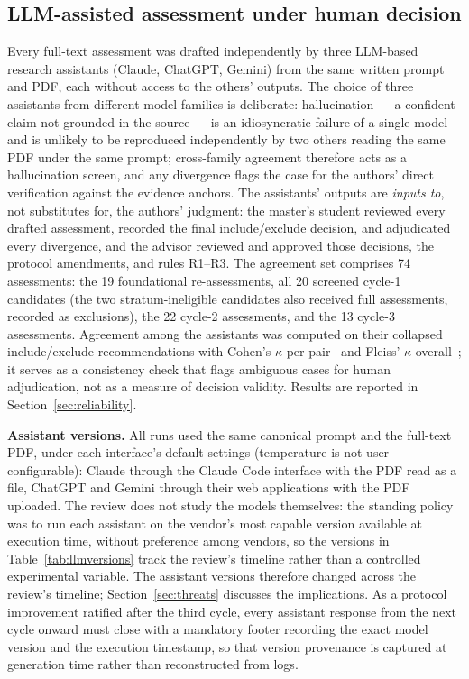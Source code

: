 \documentclass{ieeeaccess}
\begin{document}
\subsection{LLM-assisted assessment under human decision}
Every full-text assessment was drafted independently by three LLM-based
research assistants (Claude, ChatGPT, Gemini) from the same written
prompt and PDF, each without access to the others' outputs. The choice
of three assistants from different model families is deliberate:
hallucination --- a confident claim not grounded in the source --- is an
idiosyncratic failure of a single model and is unlikely to be reproduced
independently by two others reading the same PDF under the same prompt;
cross-family agreement therefore acts as a hallucination screen, and any
divergence flags the case for the authors' direct verification against
the evidence anchors. The
assistants' outputs are \emph{inputs to}, not substitutes for, the
authors' judgment: the master's student reviewed every drafted
assessment, recorded the final include/exclude decision, and
adjudicated every divergence, and the advisor reviewed and approved
those decisions, the protocol amendments, and rules R1--R3. The
agreement set comprises 74 assessments: the 19 foundational
re-assessments, all 20 screened cycle-1 candidates (the two
stratum-ineligible candidates also received full assessments, recorded
as exclusions), the 22 cycle-2 assessments, and the 13 cycle-3
assessments. Agreement among the assistants was computed on their
collapsed include/exclude recommendations with Cohen's $\kappa$ per
pair~\cite{cohen1960} and Fleiss' $\kappa$ overall~\cite{fleiss1971};
it serves as a consistency check that flags ambiguous cases for human
adjudication, not as a measure of decision validity. Results are
reported in
Section~\ref{sec:reliability}.

\textbf{Assistant versions.} All runs used the same canonical prompt and
the full-text PDF, under each interface's default settings (temperature
is not user-configurable): Claude through the Claude Code interface with
the PDF read as a file, ChatGPT and Gemini through their web applications
with the PDF uploaded. The review does not study the models themselves: the
standing policy was to run each assistant on the vendor's most capable
version available at execution time, without preference among vendors,
so the versions in Table~\ref{tab:llmversions} track the review's
timeline rather than a controlled experimental variable.
The assistant versions therefore changed across the review's timeline;
Section~\ref{sec:threats} discusses the implications. As a protocol
improvement ratified after the third cycle, every assistant response
from the next cycle onward must close with a mandatory footer recording
the exact model version and the execution timestamp, so that version
provenance is captured at generation time rather than reconstructed from
logs.
\end{document}

